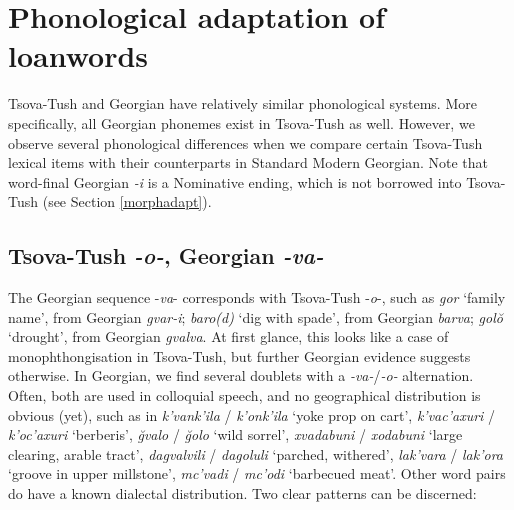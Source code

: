 \section{Phonological adaptation of loanwords} \label{loanwordsphon}


Tsova-Tush and Georgian have relatively similar phonological systems. More specifically, all Georgian phonemes exist in Tsova-Tush as well. However, we observe several phonological differences when we compare certain Tsova-Tush lexical items with their counterparts in Standard Modern Georgian. Note that word-final Georgian \textit{-i} is a Nominative ending, which is not borrowed into Tsova-Tush (see Section \ref{morphadapt}). 

\subsection{Tsova-Tush \textit{-o-}, Georgian \textit{-va-}}

The Georgian sequence -\textit{va}- corresponds with Tsova-Tush -\textit{o}-, such as \textit{gor} `family name', from Georgian \textit{gvar-i}; \textit{baro(d)} `dig with spade', from Georgian \textit{barva}; \textit{gol\u{o}} `drought', from Georgian \textit{gvalva}. At first glance, this looks like a case of monophthongisation in Tsova-Tush, but further Georgian evidence suggests otherwise. In Georgian, we find several doublets with a \textit{-va-}/\textit{-o-} alternation. Often, both are used in colloquial speech, and no geographical distribution is obvious (yet), such as in \textit{k'vank'ila} / \textit{k'onk'ila} `yoke prop on cart',
\textit{k'vac'axuri} / \textit{k'oc'axuri} `berberis',
\textit{\u{g}valo} / \textit{\u{g}olo} `wild sorrel',
\textit{xvadabuni} / \textit{xodabuni} `large clearing, arable tract',
\textit{dagvalvili} / \textit{dagoluli} `parched, withered',
\textit{lak'vara} / \textit{lak'ora} `groove in upper millstone',
\textit{mc'vadi} / \textit{mc'odi} `barbecued meat'.
Other word pairs do have a known dialectal distribution. Two clear patterns can be discerned: 


